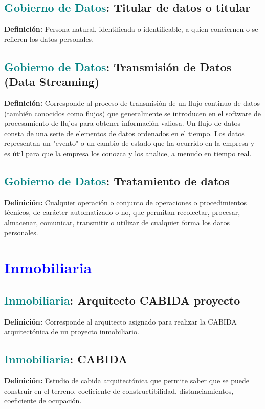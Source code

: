 \documentclass[12pt]{article}
\begin{document}
\subsection{\textcolor{teal}{Gobierno de Datos}: Titular de datos o titular}
\textbf{Definición:} Persona natural, identificada o identificable, a quien conciernen o se refieren los datos personales. 
\subsection{\textcolor{teal}{Gobierno de Datos}: Transmisión de Datos (Data Streaming)}
\textbf{Definición:} Corresponde al proceso de transmisión de un flujo continuo de datos (también conocidos como flujos) que generalmente se introducen en el software de procesamiento de flujos para obtener información valiosa. Un flujo de datos consta de una serie de elementos de datos ordenados en el tiempo. Los datos representan un "evento" o un cambio de estado que ha ocurrido en la empresa y es útil para que la empresa los conozca y los analice, a menudo en tiempo real.
\subsection{\textcolor{teal}{Gobierno de Datos}: Tratamiento de datos}
\textbf{Definición:} Cualquier operación o conjunto de operaciones o procedimientos técnicos, de carácter automatizado o no, que permitan recolectar, procesar, almacenar, comunicar, transmitir o utilizar de cualquier forma los datos personales.
\section{\textcolor{blue}{Inmobiliaria}}
\subsection{\textcolor{teal}{Inmobiliaria}: Arquitecto CABIDA proyecto}
\textbf{Definición:} Corresponde al arquitecto asignado para realizar la CABIDA arquitectónica de un proyecto inmobiliario.
\subsection{\textcolor{teal}{Inmobiliaria}: CABIDA}
\textbf{Definición:} Estudio de cabida arquitectónica que permite saber que se puede construir en el terreno, coeficiente de constructibilidad, distanciamientos, coeficiente de ocupación.
\end{document}

